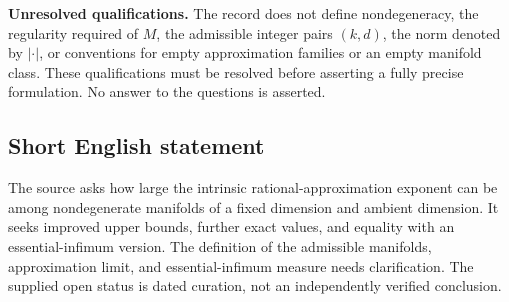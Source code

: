\documentclass[11pt]{article}
\begin{document}
\textbf{Unresolved qualifications.} The record does not define nondegeneracy, the regularity required of \(M\), the admissible integer pairs \((k,d)\), the norm denoted by \(|\cdot|\), or conventions for empty approximation families or an empty manifold class. These qualifications must be resolved before asserting a fully precise formulation. No answer to the questions is asserted.
\subsection{Short English statement}
The source asks how large the intrinsic rational-approximation exponent can be among nondegenerate manifolds of a fixed dimension and ambient dimension. It seeks improved upper bounds, further exact values, and equality with an essential-infimum version. The definition of the admissible manifolds, approximation limit, and essential-infimum measure needs clarification. The supplied open status is dated curation, not an independently verified conclusion.
\end{document}
